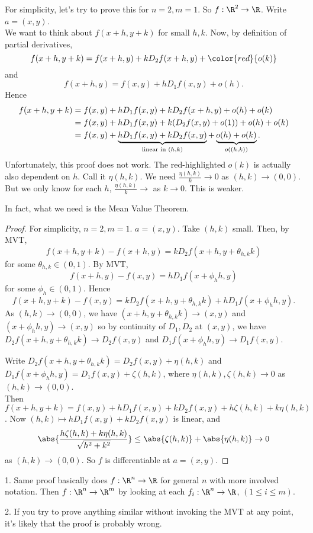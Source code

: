 For simplicity, let's try to prove this for $n=2,m=1$. So $f:\R^2\to \R$. Write $a = (x,y)$. \\
We want to think about $f(x+h,y+k)$ for small $h,k$. 
Now, by definition of partial derivatives, \[ f(x+h,y+k) = f(x+h,y) + kD_2f(x+h,y) + \color{red}{o(k)} \] and \[ f(x+h,y) = f(x,y) + hD_1f(x,y) + o(h). \] Hence
\begin{align*}
    f(x+h,y+k) &= f(x,y) + hD_1f(x,y) + kD_2f(x+h,y) + o(h) + o(k)\\
    &= f(x,y) + hD_1f(x,y) + k(D_2f(x,y) + o(1)) + o(h) + o(k)\\
    &=f(x,y) + \underbrace{hD_1f(x,y) + kD_2f(x,y)}_{\textup{linear in }(h,k)} + \underbrace{o(h) + o(k)}_{o((h,k))}.
\end{align*}
Unfortunately, this proof does not work. The red-highlighted $o(k)$ is actually also dependent on $h$. Call it $\eta(h,k)$. We need $\frac{\eta(h,k)}{k}\to 0$ as $(h,k) \to (0,0)$. But we only know for each $h$, $\frac{\eta(h,k)}{k}\to$ as $k\to 0$. This is weaker. 

In fact, what we need is the Mean Value Theorem.

\begin{proof}
    For simplicity, $n=2,m=1$. $a=(x,y)$. Take $(h,k)$ small.
    Then, by MVT, \[f(x+h,y+k) - f(x+h,y) = kD_2f(x+h, y+\theta_{h,k}k) \] for some $\theta_{h,k}\in (0,1)$. 
    By MVT, \[f(x+h,y) - f(x,y) = hD_1f(x+\phi_h h, y) \] for some $\phi_h\in (0,1)$. Hence \[ f(x+h,y+k) - f(x,y) = kD_2f(x+h, y+\theta_{h,k}k) + hD_1f(x+\phi_h h, y) .\]
    As $(h,k)\to (0,0)$, we have $(x+h, y+\theta_{h,k}k)\to(x,y)$ and $(x+\phi_h h, y) \to (x,y)$ so by continuity of $D_1,D_2$ at $(x,y)$, we have $D_2f(x+h, y+\theta_{h,k}k) \to D_2f(x,y)$ and $D_1f(x+\phi_h h, y)\to D_1f(x,y)$.  

    Write $D_2f(x+h, y+\theta_{h,k}k) = D_2f(x,y) + \eta(h,k)$ and $D_1f(x+\phi_h h, y) = D_1 f(x,y) + \zeta(h,k)$, where $\eta(h,k), \zeta(h,k)\to 0$ as $(h,k) \to (0,0)$. \\
    Then $f(x+h,y+k) = f(x,y) + hD_1f(x,y) + kD_2f(x,y) + h\zeta(h,k) + k\eta(h,k)$. Now $(h,k)\mapsto hD_1f(x,y) + kD_2f(x,y)$ is linear, and \[ \abs{\frac{h\zeta(h,k) + k\eta(h,k)}{\sqrt{h^2+k^2}}} \leq \abs{\zeta(h,k)} + \abs{\eta(h,k)}\to 0 \] as $(h,k) \to (0,0).$ So $f$ is differentiable at $a= (x,y)$.
\end{proof}

\begin{remark}
    1. Same proof basically does $f:\R^n\to \R$ for general $n$ with more involved notation. Then $f: \R^n\to \R^m$ by looking at each $f_i: \R^n\to \R$, $(1\leq i \leq m)$.

    2. If you try to prove anything similar without invoking the MVT at any point, it's likely that the proof is probably wrong.
\end{remark}

